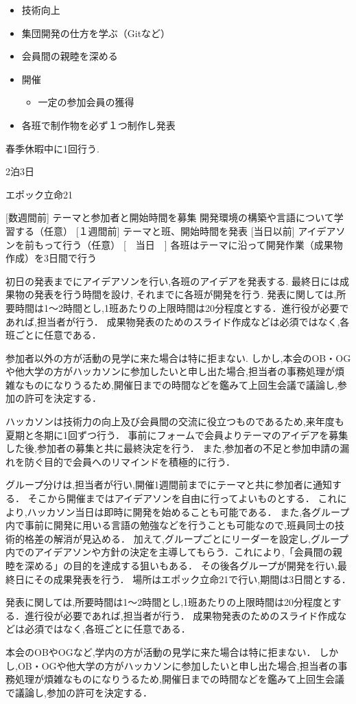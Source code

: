 \begin{itemize}
    \item 技術向上
    \item 集団開発の仕方を学ぶ（Gitなど）
    \item 会員間の親睦を深める
    \item 開催
    \begin{itemize}
        \item 一定の参加会員の獲得
    \end{itemize}
    \item 各班で制作物を必ず１つ制作し発表
\end{itemize}


春季休暇中に1回行う.

2泊3日

エポック立命21

[数週間前]	テーマと参加者と開始時間を募集
           開発環境の構築や言語について学習する（任意）
[１週間前]	テーマと班、開始時間を発表
[当日以前]	アイデアソンを前もって行う（任意）
[　当日　]	各班はテーマに沿って開発作業（成果物作成）を3日間で行う

初日の発表までにアイデアソンを行い,各班のアイデアを発表する.
最終日には成果物の発表を行う時間を設け, それまでに各班が開発を行う.
発表に関しては,所要時間は1～2時間とし,1班あたりの上限時間は20分程度とする．進行役が必要であれば,担当者が行う．
成果物発表のためのスライド作成などは必須ではなく,各班ごとに任意である．


参加者以外の方が活動の見学に来た場合は特に拒まない.
しかし,本会のOB・OGや他大学の方がハッカソンに参加したいと申し出た場合,担当者の事務処理が煩雑なものになりうるため,開催日までの時間などを鑑みて上回生会議で議論し,参加の許可を決定する．


ハッカソンは技術力の向上及び会員間の交流に役立つものであるため,来年度も夏期と冬期に1回ずつ行う．
事前にフォームで会員よりテーマのアイデアを募集した後,参加者の募集と共に最終決定を行う．
また,参加者の不足と参加申請の漏れを防ぐ目的で会員へのリマインドを積極的に行う．


グループ分けは,担当者が行い,開催1週間前までにテーマと共に参加者に通知する．
そこから開催まではアイデアソンを自由に行ってよいものとする．
これにより,ハッカソン当日は即時に開発を始めることも可能である．
また,各グループ内で事前に開発に用いる言語の勉強などを行うことも可能なので,班員同士の技術的格差の解消が見込める．
加えて,グループごとにリーダーを設定し,グループ内でのアイデアソンや方針の決定を主導してもらう．これにより,「会員間の親睦を深める」の目的を達成する狙いもある．
その後各グループが開発を行い,最終日にその成果発表を行う．
場所はエポック立命21で行い,期間は3日間とする．

発表に関しては,所要時間は1～2時間とし,1班あたりの上限時間は20分程度とする．進行役が必要であれば,担当者が行う．
成果物発表のためのスライド作成などは必須ではなく,各班ごとに任意である．

本会のOBやOGなど,学内の方が活動の見学に来た場合は特に拒まない．
しかし,OB・OGや他大学の方がハッカソンに参加したいと申し出た場合,担当者の事務処理が煩雑なものになりうるため,開催日までの時間などを鑑みて上回生会議で議論し,参加の許可を決定する．

